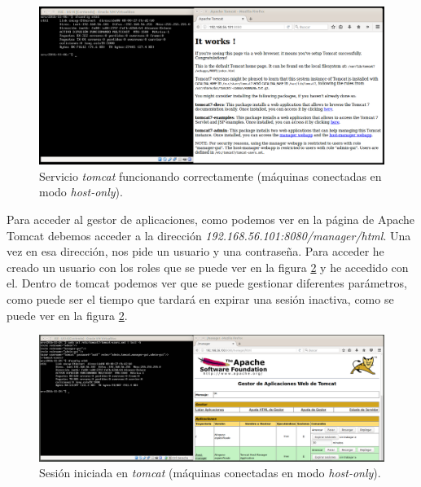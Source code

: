 \documentclass[a4paper,titlepage,12pt]{report}	%
\numberwithin{figure}{section} %
\numberwithin{table}{section} %
\begin{document}
	\begin{figure}[H]
		\includegraphics[width=\linewidth]{./Imagenes/P2/O4-tomcat.png}
		\vspace{-0.5cm}
		\caption[Servicio \textit{tomcat} funcionando correctamente (máquinas conectadas en modo \textit{host-only}).]{Servicio \textit{tomcat} funcionando correctamente (máquinas conectadas en modo \textit{host-only}).}
		\label{P2-O4-tomcat}
	\end{figure}

	Para acceder al gestor de aplicaciones, como podemos ver en la página de Apache Tomcat \cite{apachetomcatmanager} debemos acceder a la dirección \textit{192.168.56.101:8080/manager/html}. Una vez en esa dirección, nos pide un usuario y una contraseña. Para acceder he creado un usuario con los roles que se puede ver en la figura \ref{P2-O4-tomcat2} y he accedido con el. Dentro de tomcat podemos ver que se puede gestionar diferentes parámetros, como puede ser el tiempo que tardará en expirar una sesión inactiva, como se puede ver en la figura \ref{P2-O4-tomcat2}.

	\begin{figure}[H]
		\includegraphics[width=\linewidth]{./Imagenes/P2/O4-tomcat2.png}
		\vspace{-0.5cm}
		\caption[Sesión iniciada en \textit{tomcat} (máquinas conectadas en modo \textit{host-only}).]{Sesión iniciada en \textit{tomcat} (máquinas conectadas en modo \textit{host-only}).}
		\label{P2-O4-tomcat2}
	\end{figure}
\end{document}
